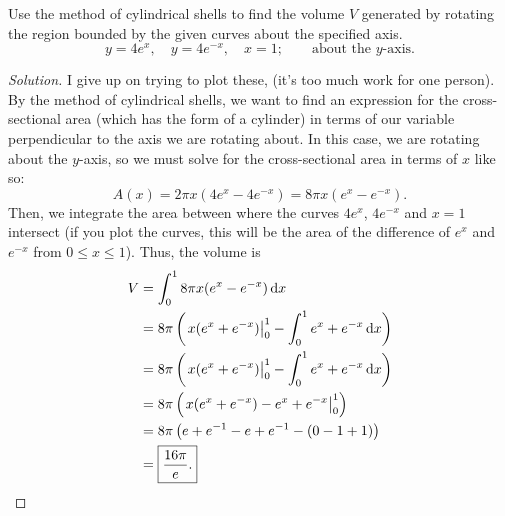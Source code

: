 \begin{problem}[WebAssign HW 9, 9]
Use the method of cylindrical shells to find the volume $V$ generated by
rotating the region bounded by the given curves about the specified axis.
\[
y=4e^x,\quad y=4e^{-x},\quad x=1;\qquad\text{about the $y$-axis.}
\]
\end{problem}
\begin{proof}[Solution]
I give up on trying to plot these, (it's too much work for one person). By
the method of cylindrical shells, we want to find an expression for the
cross-sectional area (which has the form of a cylinder) in terms of our
variable perpendicular to the axis we are rotating about. In this case, we
are rotating about the $y$-axis, so we must solve for the cross-sectional
area in terms of $x$ like so:
\[
A(x)=2\pi x(4e^x-4e^{-x})=8\pi x(e^{x}-e^{-x}).
\]
Then, we integrate the area between where the curves $4e^x$, $4e^{-x}$ and
$x=1$ intersect (if you plot the curves, this will be the area of the
difference of $e^x$ and $e^{-x}$ from $0\leq x\leq 1$). Thus, the
volume is
\begin{align*}
V&=\int_0^1 8\pi x(e^x-e^{-x})\,\mathrm{d} x\\
 &=8\pi\left(\left.x(e^x+e^{-x})\right|_0^1
   -\int_0^1 e^x+e^{-x}\,\mathrm{d} x\right)\\
 &=8\pi\left(\left.x(e^x+e^{-x})\right|_0^1
   -\int_0^1 e^x+e^{-x}\,\mathrm{d} x\right)\\
 &=8\pi\left(\left. x(e^x+e^{-x})-e^x+e^{-x}\right|_0^1\right)\\
 &=8\pi\left(e+e^{-1}-e+e^{-1}-(0-1+1)\right)\\
 &=\boxed{\frac{16\pi}{e}.}
\end{align*}
\end{proof}

